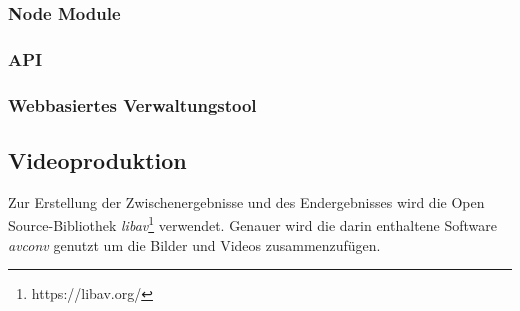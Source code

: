 \subsubsection{Node Module \label{sec:node-mudules}}



\subsubsection{API \label{sec: api}}

\subsubsection{Webbasiertes Verwaltungstool}

\subsection{Videoproduktion}

Zur Erstellung der Zwischenergebnisse und des Endergebnisses wird die Open Source-Bibliothek \emph{libav}\footnote{https://libav.org/} verwendet. Genauer wird die darin enthaltene Software \emph{avconv} genutzt um die Bilder und Videos zusammenzufügen. 
